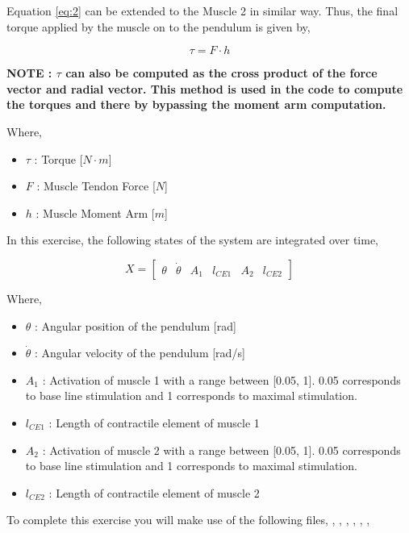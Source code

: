 \documentclass{cmc}
\begin{document}
Equation \ref{eq:2} can be extended to the Muscle 2 in similar
way. Thus, the final torque applied by the muscle on to the pendulum
is given by,

\begin{equation}
  \label{eq:3}
  \tau = F \cdot h
\end{equation}

\textbf{NOTE : $\tau$ can also be computed as the cross product of the
  force vector and radial vector. This method is used in the code to
  compute the torques and there by bypassing the moment arm
  computation.}

Where,

\begin{itemize}
\item $\tau$ : Torque [$N \cdot m$]
\item $F$ : Muscle Tendon Force [$N$]
\item $h$ : Muscle Moment Arm [$m$]

\end{itemize}

In this exercise, the following states of the system are integrated
over time,

\begin{equation}
  \label{eq:1}
  X = \begin{bmatrix}
    \theta & \dot{\theta} & A_1 & l_{CE1} & A_2 & l_{CE2}
  \end{bmatrix}
\end{equation}

Where,

\begin{itemize}
\item $\theta$ : Angular position of the pendulum [rad]
\item $\dot{\theta}$ : Angular velocity of the pendulum [rad/s]
\item $A_1$ : Activation of muscle 1 with a range between [0.05, 1].
  0.05 corresponds to base line stimulation and 1 corresponds to
  maximal stimulation.
\item $l_{CE1}$ : Length of contractile element of muscle 1
\item $A_2$ : Activation of muscle 2 with a range between [0.05, 1].
  0.05 corresponds to base line stimulation and 1 corresponds to
  maximal stimulation.
\item $l_{CE2}$ : Length of contractile element of muscle 2
\end{itemize}

To complete this exercise you will make use of the following files,
, ,
, ,
, ,
\end{document}
